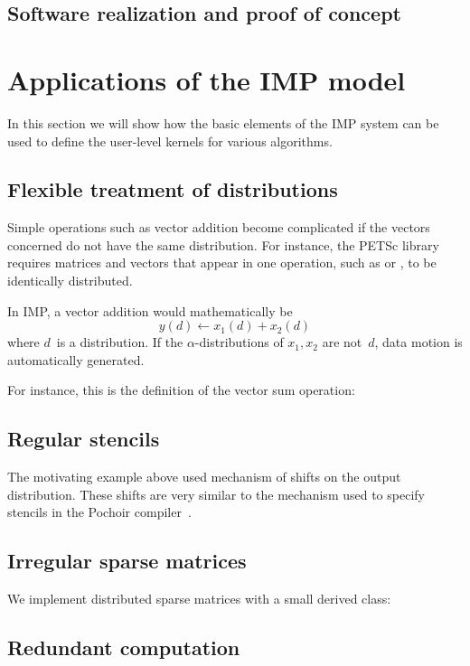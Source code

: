 \documentclass[11pt,fleqn,preprint]{impreport}
\begin{document}
\subsection{Software realization and proof of concept}
\label{imp11software}


\section{Applications of the IMP model}
\label{imp11apps}

In this section we will show how the basic elements of the \ac{IMP}
system can be used to define the user-level kernels for various
algorithms.

\subsection{Flexible treatment of distributions}
%
Simple operations such as vector addition become complicated
if the vectors concerned do not have the same distribution.
For instance, the PETSc library requires matrices and vectors
that appear in one operation, such as  or ,
to be identically distributed.

In \ac{IMP}, a vector addition would mathematically be
\[ y(d) \leftarrow x_1(d)+x_2(d) \]
where $d$~is a distribution. If the $\alpha$-distributions
of $x_1,x_2$ are not~$d$, data motion is automatically generated.

For instance, this is the definition of the vector sum operation:
%

\subsection{Regular stencils}
%
The motivating example above used mechanism of shifts on the output
distribution. These shifts are very similar to the mechanism
used to specify stencils in the Pochoir compiler~\cite{Tang:2011:pochoir}.

\subsection{Irregular sparse matrices}
%
We implement distributed sparse matrices with a small derived class:
%

\pagebreak
\subsection{Redundant computation}
\end{document}
